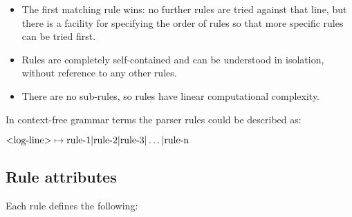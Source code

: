 \documentclass[a4paper,12pt,draft]{article}
\begin{document}
\begin{itemize}

    \item The first matching rule wins: no further rules are tried against
        that line, but there is a facility for specifying the order of
        rules so that more specific rules can be tried first.

    \item Rules are completely self-contained and can be understood in
        isolation, without reference to any other rules.

    \item There are no sub-rules, so rules have linear computational
        complexity.

\end{itemize}

\label{comparison against context-free grammars}

In context-free grammar terms the parser rules could be described as:

$\text{\textless{}log-line\textgreater{}} \mapsto \text{rule-1} |
\text{rule-2} | \text{rule-3} | \dots | \text{rule-n}$


\subsection{Rule attributes}

\label{rule attributes}

Each rule defines the following:
\end{document}
